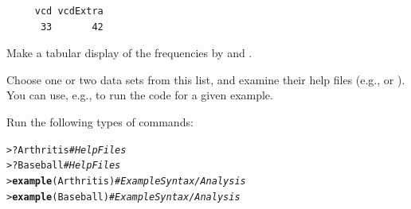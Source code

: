 \documentclass[10pt]{report}\usepackage[]{graphicx}\usepackage[]{color}
\makeatletter
\newcommand{\hlcom}[1]{\textcolor[rgb]{0.678,0.584,0.686}{\textit{#1}}}%
\newcommand{\hlopt}[1]{\textcolor[rgb]{0,0,0}{#1}}%
\newcommand{\hlstd}[1]{\textcolor[rgb]{0.345,0.345,0.345}{#1}}%
\newcommand{\hlkwd}[1]{\textcolor[rgb]{0.737,0.353,0.396}{\textbf{#1}}}%
\newenvironment{kframe}{%
 \def\at@end@of@kframe{}%
 \ifinner\ifhmode%
  \def\at@end@of@kframe{\end{minipage}}%
  \begin{minipage}{\columnwidth}%
 \fi\fi%
 \def\FrameCommand##1{\hskip\@totalleftmargin \hskip-\fboxsep
 \colorbox{shadecolor}{##1}\hskip-\fboxsep
     \hskip-\linewidth \hskip-\@totalleftmargin \hskip\columnwidth}%
 \MakeFramed {\advance\hsize-\width
   \@totalleftmargin\z@ \linewidth\hsize
   \@setminipage}}%
 {\par\unskip\endMakeFramed%
 \at@end@of@kframe}
\newenvironment{knitrout}{}{} %
\renewenvironment{knitrout}{\small\renewcommand{\baselinestretch}{.85}}{} %
\makeatother
\begin{document}
\begin{Exercises}
\begin{enumerate*}
\begin{ans}
\begin{knitrout}
\begin{kframe}
\begin{verbatim}
     vcd vcdExtra 
      33       42 
\end{verbatim}
\end{kframe}
\end{knitrout}
    \end{ans}
    
    
    \item Make a tabular display of the frequencies by  and .
    
    
    \item Choose one or two data sets from this list, and examine their help files
    (e.g.,  or ).  You can use, e.g.,
     to run the \R code for a given example.
    \begin{ans}
    Run the following types of commands:
\begin{knitrout}\footnotesize
{}\color{fgcolor}\begin{kframe}
\begin{alltt}
\hlstd{> }\hlopt{?}\hlstd{Arthritis}          \hlcom{# Help Files}
\hlstd{> }\hlopt{?}\hlstd{Baseball}           \hlcom{# Help Files}
\hlstd{> }\hlkwd{example}\hlstd{(Arthritis)}  \hlcom{# Example Syntax/Analysis}
\hlstd{> }\hlkwd{example}\hlstd{(Baseball)}   \hlcom{# Example Syntax/Analysis}
\end{alltt}
\end{kframe}
\end{knitrout}
    \end{ans}
    

\end{enumerate*}
\end{Exercises}
\end{document}
